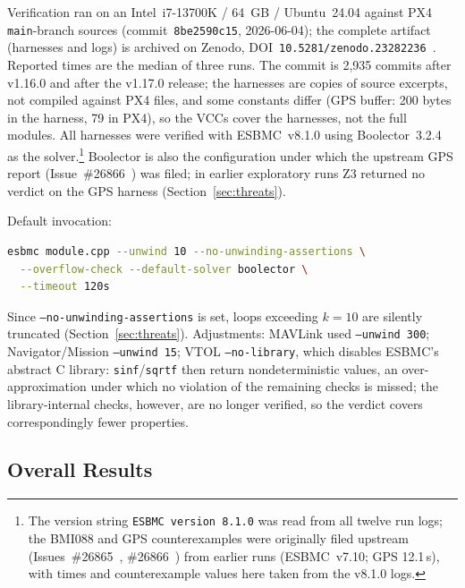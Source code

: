 \documentclass[conference]{IEEEtran}
\begin{document}
Verification ran on an Intel~i7-13700K / 64~GB / Ubuntu~24.04
against PX4 \texttt{main}-branch sources (commit~\texttt{8be2590c15},
2026-06-04); the complete artifact (harnesses and logs) is
archived on Zenodo, DOI~\texttt{10.5281/zenodo.23282236}~\cite{Zenodo2026}.
Reported times are the median of three runs. The commit is
2{,}935 commits after v1.16.0 and after the v1.17.0 release;
the harnesses are copies of source excerpts, not compiled
against PX4 files, and some constants differ (GPS buffer: 200
bytes in the harness, 79 in PX4), so the VCCs cover the
harnesses, not the full modules. All harnesses were verified
with ESBMC~v8.1.0 using Boolector~3.2.4~\cite{Brummayer2009} as the
solver.\footnote{The version string \texttt{ESBMC version 8.1.0} was read
from all twelve run logs; the BMI088 and GPS counterexamples were
originally filed upstream (Issues~\#26865~\cite{PX4_Issue26865},
\#26866~\cite{PX4_Issue26866}) from earlier runs (ESBMC~v7.10;
GPS 12.1\,s), with times and counterexample values here taken from the
v8.1.0 logs.}
Boolector is also the configuration under which the upstream
GPS report (Issue~\#26866~\cite{PX4_Issue26866}) was filed; in earlier exploratory
runs Z3 returned no verdict on the GPS harness
(Section~\ref{sec:threats}). \
\noindent\begin{minipage}{\columnwidth}
Default invocation:
\begin{lstlisting}[language=bash,breaklines=true]
esbmc module.cpp --unwind 10 --no-unwinding-assertions \
  --overflow-check --default-solver boolector \
  --timeout 120s
\end{lstlisting}
\end{minipage}
Since \texttt{--no-unwinding-assertions} is set, loops exceeding
$k=10$ are silently truncated (Section~\ref{sec:threats}).
Adjustments: MAVLink used \texttt{--unwind~300}; Navigator/Mission
\texttt{--unwind~15}; VTOL \texttt{--no-library}, which disables
ESBMC's abstract C library: \texttt{sinf}/\texttt{sqrtf} then return
nondeterministic values, an over-approximation under which no
violation of the remaining checks is missed; the
library-internal checks, however, are no longer verified, so the verdict covers correspondingly fewer properties.
\subsection{Overall Results}
\label{subsec:overall}
\end{document}
